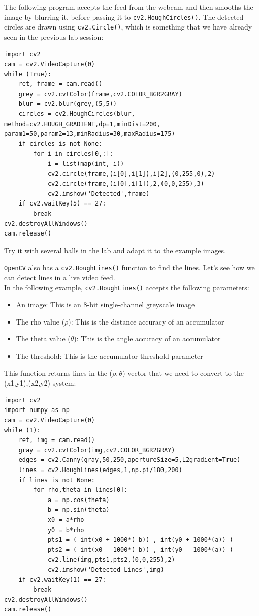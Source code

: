\documentclass{labo}
\newcommand{\opencv}{\texttt{OpenCV} }
\begin{document}
The following program accepts the feed from the webcam and then smooths the image by blurring it, before passing it to \texttt{cv2.HoughCircles()}. The detected circles are drawn using \texttt{cv2.Circle()}, which is something that we have already seen in the previous lab session:

\begin{verbatim}
import cv2
cam = cv2.VideoCapture(0) 
while (True): 
	ret, frame = cam.read() 
	grey = cv2.cvtColor(frame,cv2.COLOR_BGR2GRAY) 
	blur = cv2.blur(grey,(5,5)) 
	circles = cv2.HoughCircles(blur, method=cv2.HOUGH_GRADIENT,dp=1,minDist=200, param1=50,param2=13,minRadius=30,maxRadius=175) 
	if circles is not None: 
		for i in circles[0,:]:
			i = list(map(int, i))
			cv2.circle(frame,(i[0],i[1]),i[2],(0,255,0),2) 
			cv2.circle(frame,(i[0],i[1]),2,(0,0,255),3) 
			cv2.imshow('Detected',frame) 
	if cv2.waitKey(5) == 27: 
		break 
cv2.destroyAllWindows() 
cam.release()
\end{verbatim}

\begin{leftbar}
Try it with several balls in the lab and adapt it to the example images.
\end{leftbar}

\opencv also has a \texttt{cv2.HoughLines()} function to find the lines. Let's see how we can detect lines in a live video feed.\\

In the following example, \texttt{cv2.HoughLines()} accepts the following parameters:
\begin{itemize}
	\item An image: This is an 8-bit single-channel greyscale image 
	\item The rho value ($\rho$): This is the distance accuracy of an accumulator 
	\item The theta value ($\theta$): This is the angle accuracy of an accumulator 
	\item The threshold: This is the accumulator threshold parameter
\end{itemize}

This function returns lines in the ($\rho,\theta$) vector that we need to convert to the (x1,y1),(x2,y2) system:

\begin{verbatim}
import cv2 
import numpy as np 
cam = cv2.VideoCapture(0) 
while (1): 
	ret, img = cam.read() 
	gray = cv2.cvtColor(img,cv2.COLOR_BGR2GRAY) 
	edges = cv2.Canny(gray,50,250,apertureSize=5,L2gradient=True) 
	lines = cv2.HoughLines(edges,1,np.pi/180,200) 
	if lines is not None: 
		for rho,theta in lines[0]: 
			a = np.cos(theta) 
			b = np.sin(theta) 
			x0 = a*rho 
			y0 = b*rho 
			pts1 = ( int(x0 + 1000*(-b)) , int(y0 + 1000*(a)) ) 
			pts2 = ( int(x0 - 1000*(-b)) , int(y0 - 1000*(a)) ) 
			cv2.line(img,pts1,pts2,(0,0,255),2) 
			cv2.imshow('Detected Lines',img) 
	if cv2.waitKey(1) == 27: 
		break 
cv2.destroyAllWindows() 
cam.release()
\end{verbatim}
\end{document}
